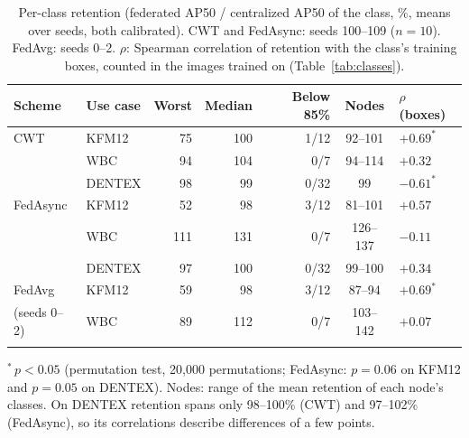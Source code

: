 \documentclass[pdflatex,sn-mathphys-num]{sn-jnl}
\begin{document}
\begin{table}[t]
\caption{Per-class retention (federated AP50 / centralized AP50 of the class, \%, means over seeds, both calibrated). CWT and FedAsync: seeds 100--109 ($n=10$). FedAvg: seeds 0--2. $\rho$: Spearman correlation of retention with the class's training boxes, counted in the images trained on (Table~\ref{tab:classes}).}\label{tab:fair}
\footnotesize
\begin{tabular*}{\textwidth}{@{\extracolsep\fill}llrrrcl}
\toprule
Scheme & Use case & Worst & Median & Below 85\% & Nodes & $\rho$ (boxes) \\
\midrule
CWT & KFM12 & 75 & 100 & 1/12 & 92--101 & $+0.69^{*}$ \\
 & WBC & 94 & 104 & 0/7 & 94--114 & $+0.32$ \\
 & DENTEX & 98 & 99 & 0/32 & 99 & $-0.61^{*}$ \\
FedAsync & KFM12 & 52 & 98 & 3/12 & 81--101 & $+0.57$ \\
 & WBC & 111 & 131 & 0/7 & 126--137 & $-0.11$ \\
 & DENTEX & 97 & 100 & 0/32 & 99--100 & $+0.34$ \\
FedAvg & KFM12 & 59 & 98 & 3/12 & 87--94 & $+0.69^{*}$ \\
(seeds 0--2) & WBC & 89 & 112 & 0/7 & 103--142 & $+0.07$ \\
\botrule
\end{tabular*}
\footnotesize{$^{*}\,p<0.05$ (permutation test, 20,000 permutations; FedAsync: $p=0.06$ on KFM12 and $p=0.05$ on DENTEX). Nodes: range of the mean retention of each node's classes. On DENTEX retention spans only 98--100\% (CWT) and 97--102\% (FedAsync), so its correlations describe differences of a few points.}
\end{table}
\end{document}
